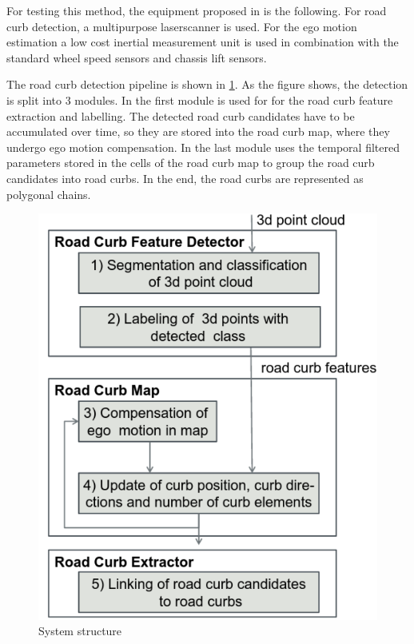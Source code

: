 \documentclass[conference]{IEEEtran}
\begin{document}
For testing this method, the equipment proposed in \cite{lidar13} is the following. For road curb detection, a multipurpose laserscanner is used. For the ego motion estimation a low cost inertial measurement unit is used in combination with the standard wheel speed sensors and chassis lift sensors. 

The road curb detection pipeline is shown in \ref{fig1}. As the figure shows, the detection is split into 3 modules. In the first module is used for for the road curb feature extraction and labelling. The detected road curb candidates have to be accumulated over time, so they are stored into the road curb map, where they undergo ego motion compensation. In the last module uses the temporal filtered parameters stored in the cells of the road curb map to group the road curb candidates into road curbs. In the end, the road curbs are represented as polygonal chains.  

\begin{figure}[ht]
	\centering
    \includegraphics[scale = 0.5]{pictures/system_structure.pdf}
	\caption{System structure \cite{lidar13}}
	\label{fig1}
\end{figure}
  
\end{document}
